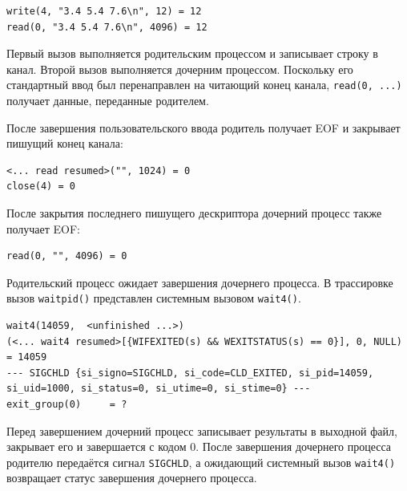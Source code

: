 \begin{lstlisting}
write(4, "3.4 5.4 7.6\n", 12) = 12
read(0, "3.4 5.4 7.6\n", 4096) = 12
\end{lstlisting}

Первый вызов выполняется родительским процессом и записывает строку
в канал. Второй вызов выполняется дочерним процессом. Поскольку его
стандартный ввод был перенаправлен на читающий конец канала,
\texttt{read(0, ...)} получает данные, переданные родителем.

После завершения пользовательского ввода родитель получает EOF и
закрывает пишущий конец канала:

\begin{lstlisting}
<... read resumed>("", 1024) = 0
close(4) = 0
\end{lstlisting}

После закрытия последнего пишущего дескриптора дочерний процесс также
получает EOF:

\begin{lstlisting}
read(0, "", 4096) = 0
\end{lstlisting}

Родительский процесс ожидает завершения дочернего процесса. В трассировке
вызов \texttt{waitpid()} представлен системным вызовом \texttt{wait4()}.

\begin{lstlisting}
wait4(14059,  <unfinished ...>)
(<... wait4 resumed>[{WIFEXITED(s) && WEXITSTATUS(s) == 0}], 0, NULL) = 14059
--- SIGCHLD {si_signo=SIGCHLD, si_code=CLD_EXITED, si_pid=14059, si_uid=1000, si_status=0, si_utime=0, si_stime=0} ---
exit_group(0)     = ?
\end{lstlisting}

Перед завершением дочерний процесс записывает результаты в выходной файл,
закрывает его и завершается с кодом 0. После завершения дочернего процесса
родителю передаётся сигнал \texttt{SIGCHLD}, а ожидающий системный вызов
\texttt{wait4()} возвращает статус завершения дочернего процесса.
